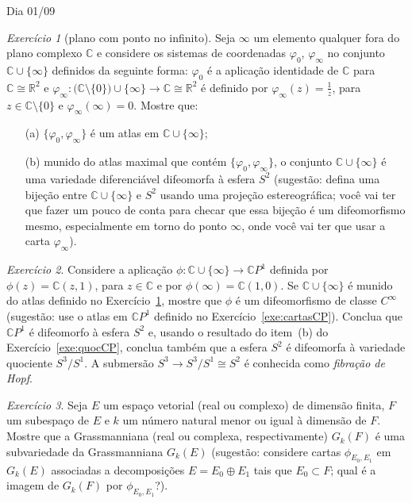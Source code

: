 \documentclass[oneside,11pt]{amsart}
\newcommand{\R}{\mathds R}
\newcommand{\C}{\mathds C}
\theoremstyle{remark}\newtheorem{exercise}{Exercício}[section]
\theoremstyle{plain}\newtheorem{teo}{Teorema}[section]
\theoremstyle{plain}\newtheorem{lem}[teo]{Lema}
\theoremstyle{plain}\newtheorem{prop}[teo]{Proposição}
\theoremstyle{definition}\newtheorem{defin}[teo]{Definição}
\theoremstyle{remark}\newtheorem{rem}[teo]{Observação}
\theoremstyle{definition}\newtheorem{example}[teo]{Exemplo}
\numberwithin{equation}{section}
\begin{document}
\begin{section}{Dia 01/09}
\begin{exercise}[plano com ponto no infinito]\label{exe:Ccupinf}
Seja $\infty$ um elemento qualquer fora do plano complexo $\C$ e considere os sistemas de coordenadas $\varphi_0$,
$\varphi_\infty$ no conjunto $\C\cup\{\infty\}$ definidos da seguinte forma: $\varphi_0$ é a aplicação identidade
de $\C$ para $\C\cong\R^2$ e $\varphi_\infty:\big(\C\setminus\{0\}\big)\cup\{\infty\}\to\C\cong\R^2$ é definido por
$\varphi_\infty(z)=\frac1z$, para $z\in\C\setminus\{0\}$ e $\varphi_\infty(\infty)=0$. Mostre que:
\begin{itemize}
\item[(a)] $\{\varphi_0,\varphi_\infty\}$ é um atlas em $\C\cup\{\infty\}$;
\item[(b)] munido do atlas maximal que contém $\{\varphi_0,\varphi_\infty\}$, o conjunto $\C\cup\{\infty\}$ é uma variedade
diferenciável difeomorfa à esfera $S^2$ (sugestão: defina uma bijeção entre $\C\cup\{\infty\}$ e $S^2$
usando uma projeção estereográfica; você vai ter que fazer um pouco de conta para checar que essa bijeção é um difeomorfismo
mesmo, especialmente em torno do ponto $\infty$, onde você vai ter que usar a carta $\varphi_\infty$).
\end{itemize}
\end{exercise}

\begin{exercise}
Considere a aplicação $\phi:\C\cup\{\infty\}\to\C P^1$ definida por $\phi(z)=\C(z,1)$, para $z\in\C$ e
por $\phi(\infty)=\C(1,0)$. Se $\C\cup\{\infty\}$ é munido do atlas definido no Exercício~\ref{exe:Ccupinf},
mostre que $\phi$ é um difeomorfismo de classe $C^\infty$ (sugestão: use o atlas em $\C P^1$ definido no
Exercício~\ref{exe:cartasCP}). Conclua que $\C P^1$ é difeomorfo à esfera $S^2$ e, usando o resultado do item~(b)
do Exercício~\ref{exe:quocCP}, conclua também que a esfera $S^2$ é difeomorfa à variedade quociente $S^3/S^1$.
A submersão $S^3\to S^3/S^1\cong S^2$ é conhecida como {\em fibração de Hopf}.
\end{exercise}

\begin{exercise}\label{exe:GkFGkE}
Seja $E$ um espaço vetorial (real ou complexo) de dimensão finita, $F$ um subespaço de $E$ e $k$ um número natural menor ou igual à dimensão de $F$.
Mostre que a Grassmanniana (real ou complexa, respectivamente) $G_k(F)$ é uma subvariedade da Grassmanniana $G_k(E)$ (sugestão: considere cartas
$\phi_{E_0,E_1}$ em $G_k(E)$ associadas a decomposições $E=E_0\oplus E_1$ tais que $E_0\subset F$; qual é a imagem de $G_k(F)$ por $\phi_{E_0,E_1}$?).
\end{exercise}


\end{section}
\end{document}
